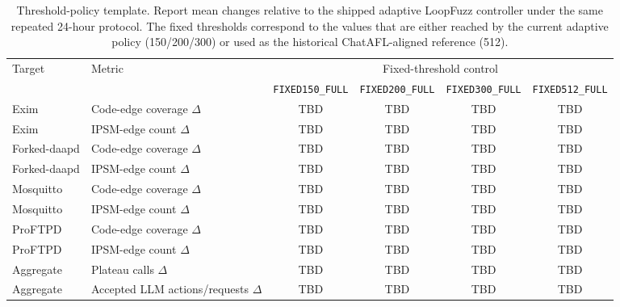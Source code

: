 \documentclass[conference]{IEEEtran}
\begin{document}
\begin{table}[t]
\centering
\caption{Threshold-policy template. Report mean changes relative to the shipped adaptive LoopFuzz controller under the same repeated 24-hour protocol. The fixed thresholds correspond to the values that are either reached by the current adaptive policy (150/200/300) or used as the historical ChatAFL-aligned reference (512).}
\label{tab:ablation_threshold_template}
\scriptsize
\begin{tabular}{l l|c c c c}
\toprule
\multirow{2}{*}{Target} & \multirow{2}{*}{Metric} & \multicolumn{4}{c}{Fixed-threshold control} \\
& & \texttt{FIXED150\_FULL} & \texttt{FIXED200\_FULL} & \texttt{FIXED300\_FULL} & \texttt{FIXED512\_FULL} \\
\midrule
Exim & Code-edge coverage $\Delta$ & TBD & TBD & TBD & TBD \\
Exim & IPSM-edge count $\Delta$ & TBD & TBD & TBD & TBD \\
Forked-daapd & Code-edge coverage $\Delta$ & TBD & TBD & TBD & TBD \\
Forked-daapd & IPSM-edge count $\Delta$ & TBD & TBD & TBD & TBD \\
Mosquitto & Code-edge coverage $\Delta$ & TBD & TBD & TBD & TBD \\
Mosquitto & IPSM-edge count $\Delta$ & TBD & TBD & TBD & TBD \\
ProFTPD & Code-edge coverage $\Delta$ & TBD & TBD & TBD & TBD \\
ProFTPD & IPSM-edge count $\Delta$ & TBD & TBD & TBD & TBD \\
Aggregate & Plateau calls $\Delta$ & TBD & TBD & TBD & TBD \\
Aggregate & Accepted LLM actions/requests $\Delta$ & TBD & TBD & TBD & TBD \\
\bottomrule
\end{tabular}
\normalsize
\end{table}
\end{document}
